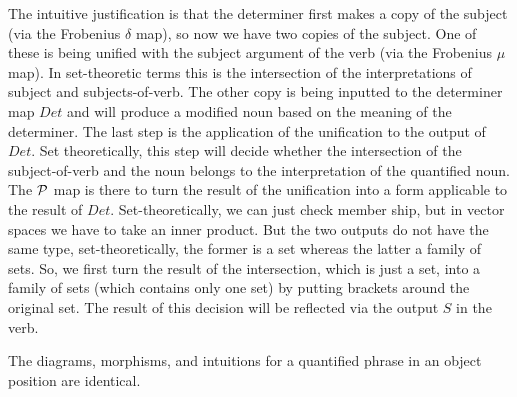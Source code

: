 The intuitive justification  is that the determiner first makes a copy of the subject (via the Frobenius $\delta$ map), so now we have two copies of the subject. One of these is being unified with the subject argument of the verb (via the Frobenius $\mu$ map). In set-theoretic terms this is the intersection of the interpretations of subject and subjects-of-verb. The other copy is being inputted to the determiner map $Det$ and will produce a modified noun based on the meaning of the determiner.  The last step is the application of the unification to the output of $Det$. Set theoretically, this step will decide whether the intersection of the subject-of-verb and the noun belongs to the interpretation of the quantified noun. The ${\cal P}$ map is there to turn the result of  the unification into a form applicable to the result of $Det$.  Set-theoretically, we can just check member ship, but in vector spaces we have to take an inner product. But the two outputs do not have the same type, set-theoretically, the former is a set whereas the latter a family of sets. So, we first  turn the result of the intersection, which is just a set, into a family of sets (which contains only one set) by putting brackets around the original set. The result of this decision will be reflected via the output  $S$ in the verb. 
 
The diagrams,  morphisms, and intuitions for a quantified phrase in an object position are identical.


